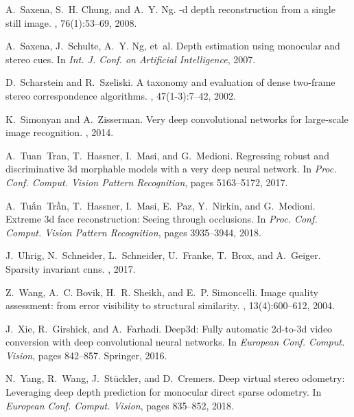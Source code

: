 \documentclass[10pt,twocolumn,letterpaper]{article}
\begin{document}
{\begin{thebibliography}{10}
A.~Saxena, S.~H. Chung, and A.~Y. Ng.
-d depth reconstruction from a single still image.
, 76(1):53--69, 2008.

A.~Saxena, J.~Schulte, A.~Y. Ng, et~al.
\newblock Depth estimation using monocular and stereo cues.
\newblock In {\em Int. J. Conf. on Artificial Intelligence}, 2007.

D.~Scharstein and R.~Szeliski.
\newblock A taxonomy and evaluation of dense two-frame stereo correspondence
  algorithms.
, 47(1-3):7--42, 2002.

K.~Simonyan and A.~Zisserman.
\newblock Very deep convolutional networks for large-scale image recognition.
, 2014.

A.~Tuan~Tran, T.~Hassner, I.~Masi, and G.~Medioni.
\newblock Regressing robust and discriminative 3d morphable models with a very
  deep neural network.
\newblock In {\em Proc. Conf. Comput. Vision Pattern Recognition}, pages
  5163--5172, 2017.

A.~Tuấn~Trần, T.~Hassner, I.~Masi, E.~Paz, Y.~Nirkin, and G.~Medioni.
\newblock Extreme 3d face reconstruction: Seeing through occlusions.
\newblock In {\em Proc. Conf. Comput. Vision Pattern Recognition}, pages
  3935--3944, 2018.

J.~Uhrig, N.~Schneider, L.~Schneider, U.~Franke, T.~Brox, and A.~Geiger.
\newblock Sparsity invariant cnns.
, 2017.

Z.~Wang, A.~C. Bovik, H.~R. Sheikh, and E.~P. Simoncelli.
\newblock Image quality assessment: from error visibility to structural
  similarity.
, 13(4):600--612, 2004.

J.~Xie, R.~Girshick, and A.~Farhadi.
\newblock Deep3d: Fully automatic 2d-to-3d video conversion with deep
  convolutional neural networks.
\newblock In {\em European Conf. Comput. Vision}, pages 842--857. Springer,
  2016.

N.~Yang, R.~Wang, J.~St{\"u}ckler, and D.~Cremers.
\newblock Deep virtual stereo odometry: Leveraging deep depth prediction for
  monocular direct sparse odometry.
\newblock In {\em European Conf. Comput. Vision}, pages 835--852, 2018.


\end{thebibliography}}
\end{document}
